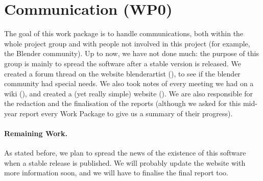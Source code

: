 \section{Communication (WP0)}

The goal of this work package is to handle communications, both within the whole project group and with people not involved in this project (for example, the Blender community). Up to now, we have not done much: the purpose of this group is mainly to spread the software after a stable version is released. We created a forum thread on the website blenderartist (\cite{blenderartist}), to see if the blender community had special needs. We also took notes of every meeting we had on a wiki (\cite{comptesrendus}), and created a (yet really simple) website (\cite{site}). We are also responsible for the redaction and the finalisation of the reports (although we asked for this mid-year report every Work Package to give us a summary of their progress).

\paragraph{Remaining Work.} As stated before, we plan to spread the news of the existence of this software when a stable release is published. We will probably update the website with more information soon, and we will have to finalise the final report too.
